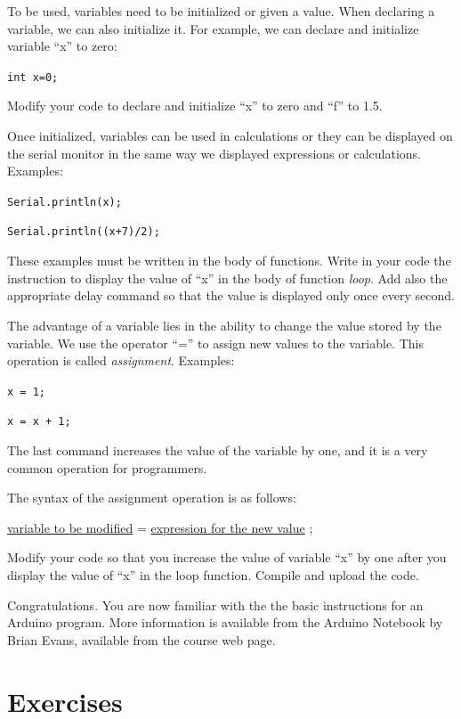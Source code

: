 \documentclass[12pt]{book}
\begin{document}
\begin{compactitem}[--]
  \item To be used, variables need to be initialized or given a
    value. When declaring a variable, we can also initialize it. For
    example, we can declare and initialize variable ``x'' to zero:

    \lstinline$int x=0;$

    Modify your code to declare and initialize ``x'' to zero and ``f''
    to 1.5.

  \item Once initialized, variables can be used in calculations or
    they can be displayed on the serial monitor in the same way we
    displayed expressions or calculations. Examples:
    
    \lstinline$Serial.println(x);$

    \lstinline$Serial.println((x+7)/2);$

    These examples must be written in the body of functions. Write in
    your code the instruction to display the value of ``x'' in the
    body of function \emph{loop}. Add also the appropriate delay
    command so that the value is displayed only once every second.

  \item The advantage of a variable lies in the ability to change the value
    stored by the variable. We use the operator ``='' to assign new
    values to the variable. This operation is called
    \emph{assignment}. Examples:

    \lstinline$x = 1;$

    \lstinline$x = x + 1;$

    The last command increases the value of the variable by one, and
    it is a very common operation for programmers.

    The syntax of the assignment operation is as follows:

    \underline{variable to
      be modified} = \underline{expression for the new value} ;

    Modify your code so that you increase the value of variable ``x''
    by one after you display the value of ``x'' in the loop function.
    Compile and upload the code.
\end{compactitem}

Congratulations. You are now familiar with the the basic instructions
for an Arduino program. More information is available from the Arduino
Notebook by Brian Evans, available from the course web page.


\section{Exercises}
\end{document}
